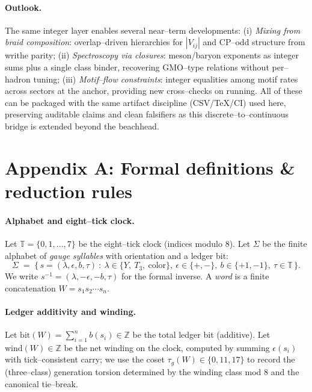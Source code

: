 \documentclass[epjc3]{svjour3}
\begin{document}
\paragraph{Outlook.}
The same integer layer enables several near–term developments:
(i) \emph{Mixing from braid composition}: overlap–driven hierarchies for $|V_{ij}|$ and CP–odd structure from writhe parity;
(ii) \emph{Spectroscopy via closures}: meson/baryon exponents as integer sums plus a single class binder, recovering GMO–type relations without per–hadron tuning;
(iii) \emph{Motif–flow constraints}: integer equalities among motif rates across sectors at the anchor, providing new cross–checks on running.
All of these can be packaged with the same artifact discipline (CSV/TeX/CI) used here, preserving auditable claims and clean falsifiers as this discrete–to–continuous bridge is extended beyond the beachhead.

\appendix
\section*{Appendix A: Formal definitions \& reduction rules}

\paragraph{Alphabet and eight–tick clock.}
Let $\mathbb{T}=\{0,1,\dots,7\}$ be the eight–tick clock (indices modulo $8$).  
Let $\Sigma$ be the finite alphabet of \emph{gauge syllables} with orientation and a ledger bit:
\[
  \Sigma \;=\; \bigl\{\, s=(\lambda,\epsilon,b,\tau)\ :\ 
    \lambda\in\{Y,\ T_3,\ \text{color}\},\ 
    \epsilon\in\{+,-\},\ 
    b\in\{+1,-1\},\ 
    \tau\in\mathbb{T}
  \,\bigr\}.
\]
We write $s^{-1}=(\lambda,-\epsilon,-b,\tau)$ for the formal inverse.  
A \emph{word} is a finite concatenation $W=s_1s_2\cdots s_n$.

\paragraph{Ledger additivity and winding.}
Let $\mathrm{bit}(W)=\sum_{i=1}^n b(s_i)\in\mathbb{Z}$ be the total ledger bit (additive).  
Let $\mathrm{wind}(W)\in\mathbb{Z}$ be the net winding on the clock, computed by summing $\epsilon(s_i)$ with tick–consistent carry; we use the coset
\(
  \tau_g(W)\in\{0,11,17\}
\)
to record the (three–class) generation torsion determined by the winding class mod $8$ and the canonical tie–break.
\end{document}
